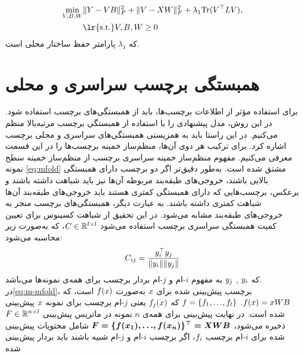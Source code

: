 \begin{align}\label{eq:m-mfold}
	\min_{\boldmath{V},\boldmath{B},\boldmath{W}}&\lVert\boldmath{Y}-\boldmath{V}\boldmath{B}\rVert^2_F+\lVert\boldmath{V}-\boldmath{X}\boldmath{W}\rVert^2_F +\lambda_1{\mathrm{Tr}\boldmath{({V}^\top{LV})}}
	,\nonumber \\
	&{\text{\lr{s.t.}}}\boldmath{V},\boldmath{B},\boldmath{W}\geq 0
\end{align}
که 
$\lambda_1$
پارامتر حفظ ساختار محلی است.
\section{همبستگی برچسب سراسری و محلی}\label{GLOCAL}
برای استفاده مؤثر از اطلاعات برچسب‌ها، باید از همبستگی‌های برچسب استفاده شود. در این روش، مدل پیشنهادی را با استفاده از همبستگی برچسب مرتبه‌بالا منظم می‌کنیم. در این راستا باید به همزیستی همبستگی‌های سراسری و محلی برچسب اشاره کرد. برای ترکیب هر دوی آن‌ها، منظم‌ساز خمینه برچسب‌ها را در این قسمت معرفی می‌کنیم. مفهوم منظم‌ساز خمینه سراسری برچسب‌ ‌از منظم‌ساز خمینه سطح نمونه \eqref{eq:mfold} مشتق شده است. به‌طور دقیق‌تر اگر دو برچسب دارای همبستگی بالایی باشند، خروجی‌های طبقه‌بند مربوطه آن‌ها نیز باید شباهت داشته باشند و برعکس، برچسب‌هایی که دارای همبستگی کمتری هستند باید خروجی‌های طبقه‌بند آن‌ها شباهت کمتری داشته باشند. به عبارت دیگر، همبستگی‌های برچسب منجر به خروجی‌های طبقه‌بند مشابه می‌شود. در این تحقیق از شباهت کسینوس برای تعیین کمیت همبستگی سراسری برچسب استفاده می‌شود $\boldmath{C} \in\mathbb{R}^{l \times l}$، که به‌صورت زیر محاسبه می‌شود: 
\begin{align}\label{eq:gloCor}	
	{{{C}_{ij}=\frac{\boldmath{y}^\top_{i}{\boldmath{y}_{j}}}{{\lVert{\boldmath{y}_i}\lVert} \lVert{\boldmath{y}_{j}}\lVert}}}
\end{align}
که
$\boldmath{y}_i$ 
, 
$\boldmath{y}_j$
به مفهوم $i$-ام و $j$-ام بردار برچسب برای همه‌ی نمونه‌ها می‌باشد.‎\\
در\eqref{eq:m-mfold}، برچسب پیش‌بینی شده برای $\boldmath{x}$ به‌صورت $f(\boldmath{x})$ است، که $f(\boldmath{x}) = \boldmath{x}\boldmath{WB}$. 
$\boldmath{f} = \{{f}_1, {\dots}, {f}_l\}$
که $\boldmath{f}_j(\boldmath{x})$ یعنی $j$-ام برچسب برای نمونه $\boldmath{x}$ پیش‌بینی شده است. در نهایت پیش‌بینی برای همه‌ی ${n}$ نمونه در ماتریس پیش‌بینی $\boldmath{F}\in\mathbb{R}^{n \times l}$ ذخیره می‌شود،‌ $\boldmath{F}= \{f({\boldmath{x}}_1),{\dots},f({\boldmath{x}}_n)\}^\top = \boldmath{XWB}$ شامل محتویات پیش‌بینی شده برای $i$-ام برچسب $\boldmath{f}_i$، اگر برچسب ${i}$-ام و ${j}$-ام شبیه باشند باید بردار پیش‌بینی شده

